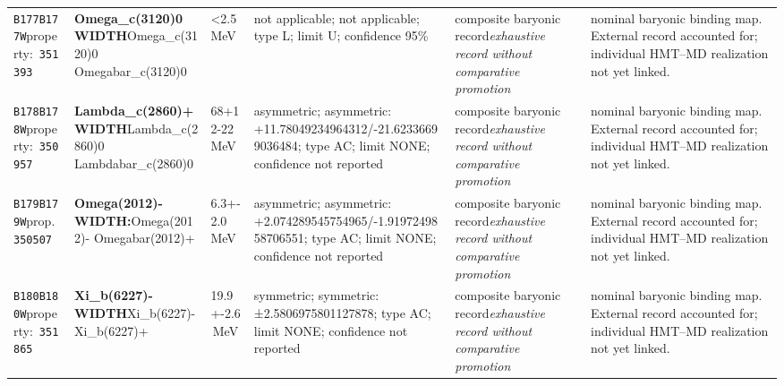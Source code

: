 \begin{landscape}
\begin{longtable}{L{1.85cm}L{4.45cm}L{2.35cm}L{4.05cm}L{3.35cm}L{7.15cm}}
\texttt{B177}\newline \texttt{B177W}\newline property:\ \texttt{351393} & \textbf{Omega\_\allowbreak{}c(3120)0 WIDTH}\newline Omega\_\allowbreak{}c(3120)0 \textbar{}\allowbreak{} Omegabar\_\allowbreak{}c(3120)0 & \textless{}2.5\,MeV & not applicable; not applicable; type L; limit U; confidence 95\% & composite baryonic record\newline \emph{exhaustive record without comparative promotion} & nominal baryonic binding map. External record accounted for; individual HMT--MD realization not yet linked. \\
\texttt{B178}\newline \texttt{B178W}\newline property:\ \texttt{350957} & \textbf{Lambda\_\allowbreak{}c(2860)+ WIDTH}\newline Lambda\_\allowbreak{}c(2860)0 \textbar{}\allowbreak{} Lambdabar\_\allowbreak{}c(2860)0 & 68+12-22\,MeV & asymmetric; asymmetric: +11.78049234964312/-21.62336699036484; type AC; limit NONE; confidence not reported & composite baryonic record\newline \emph{exhaustive record without comparative promotion} & nominal baryonic binding map. External record accounted for; individual HMT--MD realization not yet linked. \\
\texttt{B179}\newline \texttt{B179W}\newline prop.\ \texttt{350507} & \textbf{Omega(2012)- WIDTH:}\newline Omega(2012)- \textbar{}\allowbreak{} Omegabar(2012)+ & 6.3+-2.0\,MeV & asymmetric; asymmetric: +2.074289545754965/-1.9197249858706551; type AC; limit NONE; confidence not reported & composite baryonic record\newline \emph{exhaustive record without comparative promotion} & nominal baryonic binding map. External record accounted for; individual HMT--MD realization not yet linked. \\
\texttt{B180}\newline \texttt{B180W}\newline property:\ \texttt{351865} & \textbf{Xi\_\allowbreak{}b(6227)- WIDTH}\newline Xi\_\allowbreak{}b(6227)- \textbar{}\allowbreak{} Xi\_\allowbreak{}b(6227)+ & 19.9+-2.6\,MeV & symmetric; symmetric: ±2.5806975801127878; type AC; limit NONE; confidence not reported & composite baryonic record\newline \emph{exhaustive record without comparative promotion} & nominal baryonic binding map. External record accounted for; individual HMT--MD realization not yet linked. \\

\end{longtable}
\end{landscape}
